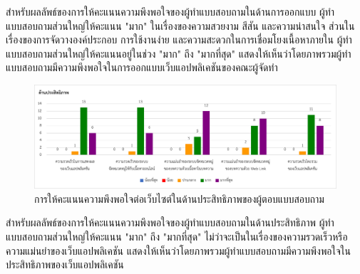 \documentclass[12pt,oneside,openright,a4paper]{cpe-thai-project}
\begin{document}
      \hspace{1cm}สำหรับผลลัพธ์ของการให้คะแนนความพึงพอใจของผู้ทำแบบสอบถามในด้านการออกแบบ ผู้ทำแบบสอบถามส่วนใหญ่ให้คะแนน "มาก"
      ในเรื่องของความสวยงาม สีสัน และความน่าสนใจ ส่วนในเรื่องของการจัดวางองค์ประกอบ การใช้งานง่าย และความสะดวกในการเชื่อมโยงเนื้อหาภายใน
      ผู้ทำแบบสอบถามส่วนใหญ่ให้คะแนนอยู่ในช่วง "มาก" ถึง "มากที่สุด" 
      แสดงให้เห็นว่าโดยภาพรวมผู้ทำแบบสอบถามมีความพึงพอใจในการออกแบบเว็บแอปพลิเคชันของคณะผู้จัดทำ
      \newpage
      \begin{figure}[!ht]\centering
        \includegraphics[width=\textwidth]{./img/test/efficient.png}
        \caption{การให้คะแนนความพึงพอใจต่อเว็บไซต์ในด้านประสิทธิภาพของผู้ตอบแบบสอบถาม}\label{fig:user_test_eff}
      \end{figure}

      \hspace{1cm}สำหรับผลลัพธ์ของการให้คะแนนความพึงพอใจของผู้ทำแบบสอบถามในด้านประสิทธิภาพ ผู้ทำแบบสอบถามส่วนใหญ่ให้คะแนน
      "มาก" ถึง "มากที่สุด" ไม่ว่าจะเป็นในเรื่องของความรวดเร็วหรือความแม่นยำของเว็บแอปพลิเคชัน 
      แสดงให้เห็นว่าโดยภาพรวมผู้ทำแบบสอบถามมีความพึงพอใจในประสิทธิภาพของเว็บแอปพลิเคชัน
    
\end{document}
